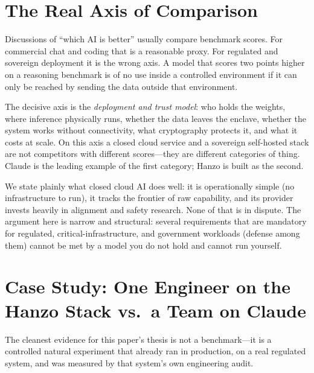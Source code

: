 \documentclass[11pt,letterpaper]{article}
\begin{document}
\tableofcontents
\newpage

\section{The Real Axis of Comparison}

Discussions of ``which AI is better'' usually compare benchmark scores. For
commercial chat and coding that is a reasonable proxy. For regulated and
sovereign deployment it is the wrong axis. A model that scores two points higher on a
reasoning benchmark is of no use inside a controlled environment if it can only
be reached by sending the data outside that environment.

The decisive axis is the \emph{deployment and trust model}: who holds the weights,
where inference physically runs, whether the data leaves the enclave, whether the
system works without connectivity, what cryptography protects it, and what it
costs at scale. On this axis a closed cloud service and a sovereign self-hosted
stack are not competitors with different scores---they are different categories
of thing. Claude is the leading example of the first category; Hanzo is built as
the second.

We state plainly what closed cloud AI does well: it is operationally simple
(no infrastructure to run), it tracks the frontier of raw capability, and its
provider invests heavily in alignment and safety research. None of that is in
dispute. The argument here is narrow and structural: several requirements that
are mandatory for regulated, critical-infrastructure, and government workloads
(defense among them) cannot be met by a model you
do not hold and cannot run yourself.

\section{Case Study: One Engineer on the Hanzo Stack vs.\ a Team on Claude}
\label{sec:oneeng}

The cleanest evidence for this paper's thesis is not a benchmark---it is a
controlled natural experiment that already ran in production, on a real regulated
system, and was measured by that system's own engineering audit.
\end{document}
